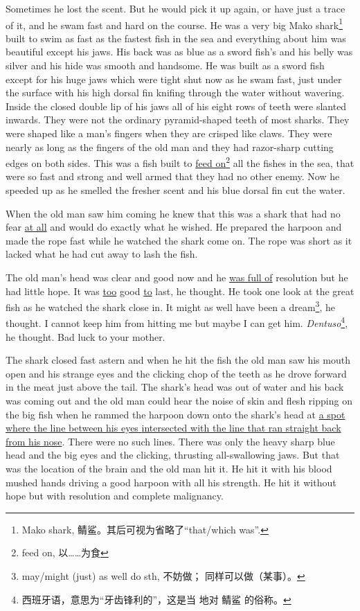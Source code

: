 \documentclass[fontset=ubuntu,zihao=-4]{ctexrep}
\begin{document}
Sometimes he lost the scent. But he would pick it up again, or have just a
\gls{trace} of it, and he swam fast and hard on the course. He was a very
big Mako shark\footnote{Mako shark, 鲭鲨。其后可视为省略了``that/which
  was''.} built to swim as fast as the fastest fish in the sea and
everything about him was beautiful except his jaws. His back was as blue as
a sword fish's and his belly was silver and his hide was smooth and
handsome. He was built as a sword fish except for his huge jaws which were
tight shut now as he swam fast, just under the surface with his high dorsal
fin \gls{knifing} through the water without wavering. Inside the closed
double lip of his jaws all of his eight rows of teeth were slanted
\gls{inwards}. They were not the \gls{ordinary} \gls{pyramid}-shaped teeth
of most sharks. They were shaped like a man's fingers when they are
\gls{crisped} like claws. They were nearly as long as the fingers of the old
man and they had \gls{razor}-sharp cutting edges on both sides. This was a
fish built to \uline{feed on}\footnote{feed on, 以……为食} all the fishes
in the sea, that were so fast and strong and well armed that they had no
other enemy. Now he speeded up as he smelled the fresher scent and his blue
dorsal fin cut the water.

When the old man saw him coming he knew that this was a shark that had no
fear \uline{at all} and would do exactly what he wished. He prepared the harpoon and
made the rope fast while he watched the shark come on. The rope was short as
it lacked what he had cut away to lash the fish.

The old man's head was clear and good now and he \uline{was full of} resolution
but he had little hope. It was \uline{too} good \uline{to} last, he thought. He
took one look at the great fish as he watched the shark close in. It might
as well have been a dream\footnote{may/might (just) as well do sth, 不妨做；
  同样可以做（某事）。}, he thought. I cannot keep him from hitting me but
maybe I can get him. \emph{Dentuso}\footnote{西班牙语，意思为“牙齿锋利的”，这是当
  地对 鲭鲨 的俗称。}, he thought. Bad luck to your mother.

The shark closed fast astern and when he hit the fish the old man saw his
mouth open and his strange eyes and the clicking chop of the teeth as he
drove forward in the meat just above the tail. The shark's head was out of
water and his back was coming out and the old man could hear the noise of
skin and flesh \gls{ripping} on the big fish when he \gls{rammed} the
harpoon down onto the shark's head at \uline{a spot where the line between his
  eyes \gls{intersected} with the line that ran straight back from his nose}.
There were no such lines. There was only the heavy sharp blue head and the
big eyes and the clicking, thrusting all-\gls{swallowing} jaws. But
that was the \gls{location} of the brain and the old man hit it. He hit it
with his blood \gls{mushed} hands driving a good harpoon with all his
strength. He hit it without hope but with resolution and complete
\gls{malignancy}.
\end{document}
